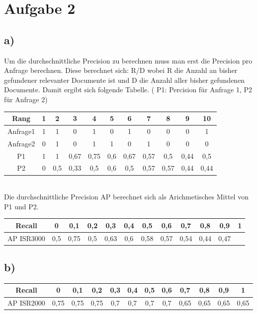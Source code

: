 \section*{Aufgabe 2}

\subsection*{a)}
Um die durchschnittliche Precision zu berechnen muss man erst die Precision pro Anfrage berechnen.
Diese berechnet sich: R/D wobei R die Anzahl an bisher gefundener relevanter Documente ist und D die Anzahl aller bisher gefundenen Documente. Damit ergibt sich folgende Tabelle. ( P1: Percision für Anfrage 1, P2 für Anfrage 2)

\begin{tabular}{|c|c|c|c|c|c|c|c|c|c|c|}
\hline Rang 	& 1 & 2  & 3  & 4  & 5  & 6  & 7  & 8  & 9  & 10 \\ 
\hline Anfrage1 & 1 & 1  & 0  & 1  & 0  & 1  & 0  & 0  & 0  & 1  \\ 
\hline Anfrage2 & 0 & 1  & 0  & 1  & 1  & 0  & 1  & 0  & 0  & 0 \\ 
\hline P1	    & 1 & 1	 & 0,67 & 0,75 & 0,6& 0,67&	0,57 & 0,5& 0,44 & 0,5\\
\hline P2		& 0	& 0,5 & 0,33 & 0,5 & 0,6 & 0,5 & 0,57 & 0,57 & 0,44 & 0,44 \\
\hline 
\end{tabular} 
\\

Die durchschnittliche Precision AP berechnet sich als Arichmetisches Mittel von P1 und P2. 
\\

\begin{tabular}{|c|c|c|c|c|c|c|c|c|c|c|c|}
\hline Recall 	  & 0    & 0,1  &  0,2 & 0,3 & 0,4 & 0,5 & 0,6 & 0,7  & 0,8  & 0,9  & 1 \\
\hline AP ISR3000 & 0,5 & 0,75 & 0,5 & 0,63 & 0,6 & 0,58 & 0,57 & 0,54 & 0,44 & 0,47\\
\hline

\end{tabular}

\subsection*{b)}
\begin{tabular}{|c|c|c|c|c|c|c|c|c|c|c|c|}
\hline Recall 	  & 0    & 0,1  &  0,2 & 0,3 & 0,4 & 0,5 & 0,6 & 0,7  & 0,8  & 0,9  & 1 \\
\hline AP ISR2000 & 0,75 & 0,75 & 0,75 & 0,7 & 0,7 & 0,7 &0,7 & 0,65 & 0,65 & 0,65 & 0,65\\

\hline

\end{tabular}

